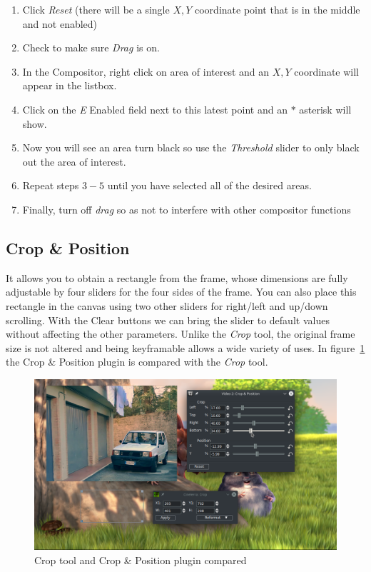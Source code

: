 \begin{enumerate}
    \item Click \textit{Reset} (there will be a single $X,Y$ coordinate point that is in the middle and not enabled)
    \item Check to make sure \textit{Drag} is on.
    \item In the Compositor, right click on area of interest and an $X,Y$ coordinate will appear in the listbox.
    \item Click on the \textit{E} Enabled field next to this latest point and an $*$ asterisk will show.
    \item Now you will see an area turn black so use the \textit{Threshold} slider to only black out the area of interest.
    \item Repeat steps $3-5$ until you have selected all of the desired areas.
    \item Finally, turn off \textit{drag} so as not to interfere with other compositor functions
\end{enumerate}

\subsection{Crop \& Position}%
\label{sub:crop_position}

It allows you to obtain a rectangle from the frame, whose dimensions are fully adjustable by four sliders for the four sides of the frame. You can also place this rectangle in the canvas using two other sliders for right/left and up/down scrolling. With the Clear buttons we can bring the slider to default values without affecting the other parameters. Unlike the \textit{Crop} tool, the original frame size is not altered and being keyframable allows a wide variety of uses. In figure~\ref{fig:crop_position} the Crop \& Position plugin is compared with the \textit{Crop} tool.

\begin{figure}[htpb]
	\centering
	\includegraphics[width=1.0\linewidth]{images/crop_position.png}
	\caption{Crop tool and Crop \& Position plugin compared}
	\label{fig:crop_position}
\end{figure}

